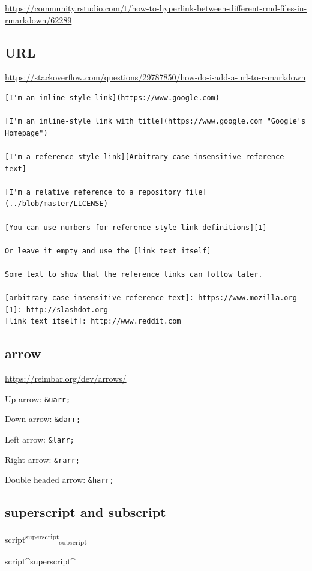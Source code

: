 \documentclass[
]{book}
\newenvironment{Shaded}{\begin{snugshade}}{\end{snugshade}}
\newcommand{\NormalTok}[1]{#1}
\theoremstyle{definition}
\theoremstyle{definition}
\theoremstyle{definition}
\theoremstyle{definition}
\theoremstyle{remark}
\begin{document}
\url{https://community.rstudio.com/t/how-to-hyperlink-between-different-rmd-files-in-rmarkdown/62289}

\subsection{URL}\label{url}

\url{https://stackoverflow.com/questions/29787850/how-do-i-add-a-url-to-r-markdown}

\begin{verbatim}
[I'm an inline-style link](https://www.google.com)

[I'm an inline-style link with title](https://www.google.com "Google's Homepage")

[I'm a reference-style link][Arbitrary case-insensitive reference text]

[I'm a relative reference to a repository file](../blob/master/LICENSE)

[You can use numbers for reference-style link definitions][1]

Or leave it empty and use the [link text itself]

Some text to show that the reference links can follow later.

[arbitrary case-insensitive reference text]: https://www.mozilla.org
[1]: http://slashdot.org
[link text itself]: http://www.reddit.com
\end{verbatim}

\subsection{arrow}\label{arrow}

\url{https://reimbar.org/dev/arrows/}

Up arrow: \texttt{\&uarr;}

Down arrow: \texttt{\&darr;}

Left arrow: \texttt{\&larr;}

Right arrow: \texttt{\&rarr;}

Double headed arrow: \texttt{\&harr;}

\subsection{superscript and subscript}\label{superscript-and-subscript}

script\textsuperscript{superscript}\textsubscript{subscript}

\begin{Shaded}
\begin{Highlighting}[]
\NormalTok{script\^{}superscript\^{}}
\end{Highlighting}
\end{Shaded}
\end{document}
